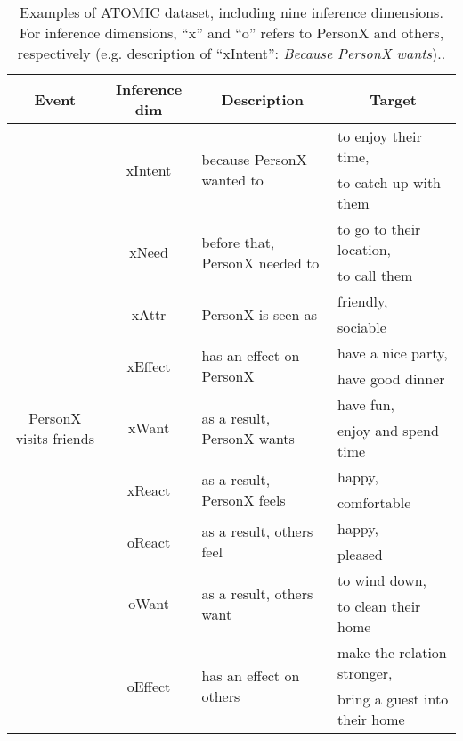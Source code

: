 \documentclass[11pt,a4paper]{article}
\begin{document}
\begin{table*}[t]
	\begin{center}
		{\small
			\begin{tabular}{c|c|l|l} 
				\hline 
				Event&Inference dim &\multicolumn{1}{c|}{Description}& \multicolumn{1}{c}{Target} \\
				\hline
				\multirow{18}{*}{PersonX visits friends}&\multirow{2}{*}{xIntent}&\multirow{2}{*}{because PersonX wanted to}&to enjoy their time,  \\
				~&~&~&to catch up with them  \\
				\cline{2-4}
				~&\multirow{2}{*}{xNeed}&\multirow{2}{*}{before that, PersonX needed to}&to go to their location,  \\
				~&~&~&to call them  \\
				\cline{2-4}
				~&\multirow{2}{*}{xAttr}&\multirow{2}{*}{PersonX is seen as}&friendly,  \\
				~&~&~&sociable  \\
				\cline{2-4}
				~&\multirow{2}{*}{xEffect}&\multirow{2}{*}{has an effect on PersonX}&have a nice party,  \\
				~&~&~&have good dinner  \\
				\cline{2-4}
				~&\multirow{2}{*}{xWant}&\multirow{2}{*}{as a result, PersonX wants}&have fun,  \\
				~&~&~&enjoy and spend time  \\
				\cline{2-4}	
				~&\multirow{2}{*}{xReact}&\multirow{2}{*}{as a result, PersonX feels}&happy,  \\
				~&~&~&comfortable  \\
				\cline{2-4}	
				~&\multirow{2}{*}{oReact}&\multirow{2}{*}{as a result, others feel}&happy,  \\
				~&~&~&pleased  \\
				\cline{2-4}	
				~&\multirow{2}{*}{oWant}&\multirow{2}{*}{as a result, others want}&to wind down,  \\
				~&~&~&to clean their home  \\
				\cline{2-4}	
				~&\multirow{2}{*}{oEffect}&\multirow{2}{*}{has an effect on others}&make the relation stronger,  \\
				~&~&~&bring a guest into their home  \\
				\cline{2-4}				
				\hline 
			\end{tabular}
		}
	\end{center}
	\caption{\label{table:ATOMIC} Examples of ATOMIC dataset, including nine inference dimensions. For inference dimensions, ``x'' and ``o'' refers to PersonX and others, respectively (e.g. description of ``xIntent'': \textit{Because PersonX wants})..}
\end{table*}
\end{document}
